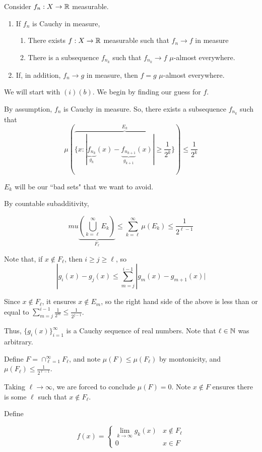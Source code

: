 \documentclass[x11names,reqno,14pt]{extarticle}
\newcommand*{\oo}{\infty}
\newcommand{\seq}[1]{_{#1 = 1}^\oo}
\begin{document}
\thm

Consider $f_n:X\to\mathbb{R}$ measurable. 
\begin{enumerate}[label=(\roman*)]
\item If $f_n$ is Cauchy in measure, 
	\begin{enumerate}[label=(\alph*)]
	\item There exists $f:X\to\mathbb{R}$ measurable such that $f_n\to f$ in measure
	\item There is a subsequence $f_{n_k}$ such that $f_{n_k}\to f$ $\mu$-almost everywhere. 
	\end{enumerate}
\item If, in addition, $f_n \to g$ in measure, then $f = g$ $\mu$-almost everywhere.
\end{enumerate}

\proof

We will start with $(i)(b)$. We begin by finding our guess for $f$. 

By assumption, $f_n$ is Cauchy in measure. So, there exists a subsequence $f_{n_k}$ such that
\[
\mu(\overbrace{\{x : |\underbrace{f_{n_k}}_{g_k}(x) - \underbrace{f_{n_{k + 1}}}_{g_{k + 1}}(x)| \geq \frac{1}{2^k}\}}^{E_k}) \leq \frac{1}{2^k}
\]

$E_k$ will be our ``bad sets" that we want to avoid. 

By countable subadditivity, 

\[
mu\underbrace{\left(\bigcup_{k=\ell}^\oo E_k\right)}_{F_\ell} \leq \sum_{k=\ell}^\oo\mu(E_k) \leq \frac{1}{2^{\ell - 1}}
\]

Note that, if $x \not\in F_\ell$, then $i \geq j \geq \ell$, so
\[
|g_i(x) - g_j(x) \leq \sum_{m=j}^{i - 1}|g_m(x) - g_{m + 1}(x)|
\]

Since $x\not\in F_\ell$, it ensures $x\not\in E_m$, so the right hand side of the above is less than or equal to $\sum_{m=j}^{i - 1}\frac{1}{2^m} \leq \frac{1}{2^{j - 1}}$. 

Thus, $\{g_i(x)\}\seq{i}$ is a Cauchy sequence of real numbers. Note that $\ell\in\mathbb{N}$ was arbitrary. 

Define $F = \cap\seq{\ell}F_\ell$, and note $\mu(F) \leq \mu(F_\ell)$ by montonicity, and $\mu(F_\ell) \leq \frac{1}{2^{\ell - 1}}$. 

Taking $\ell\to\oo$, we are forced to conclude $\mu(F) = 0$. Note $x\not\in F$ ensures there is some $\ell$ such that $x\not\in F_\ell$.

Define

\[
f(x) = \begin{cases} \lim_{k\to\oo}g_k(x) & x\not\in F_\ell \\ 0 & x\in F \end{cases}
\]
\end{document}
